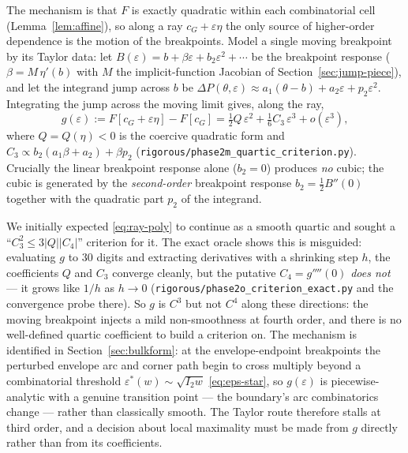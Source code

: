 \documentclass[11pt]{amsart}
\theoremstyle{plain}
\theoremstyle{definition}
\newcommand{\cG}{c_{G}}
\begin{document}
The mechanism is that $F$ is exactly quadratic within each combinatorial
cell (Lemma~\ref{lem:affine}), so along a ray $\cG+\varepsilon\eta$ the
only source of higher-order dependence is the motion of the breakpoints.
Model a single moving breakpoint by its Taylor data: let
$B(\varepsilon) = b + \beta\varepsilon + b_{2}\varepsilon^{2} + \cdots$
be the breakpoint response ($\beta = M\,\eta'(b)$ with $M$ the
implicit-function Jacobian of Section~\ref{sec:jump-piece}), and let the
integrand jump across $b$ be $\Delta P(\theta,\varepsilon) \approx
a_{1}(\theta-b) + a_{2}\varepsilon + p_{2}\varepsilon^{2}$.  Integrating
the jump across the moving limit gives, along the ray,
\begin{equation}\label{eq:ray-poly}
   g(\varepsilon) := F[\cG+\varepsilon\eta]-F[\cG]
   = \tfrac12 Q\,\varepsilon^{2}
   + \tfrac16 C_{3}\,\varepsilon^{3}
   + o(\varepsilon^{3}),
\end{equation}
where $Q = Q(\eta) < 0$ is the coercive quadratic form and
$C_{3}\propto b_{2}(a_{1}\beta+a_{2})+\beta p_{2}$
(\texttt{rigorous/phase2m\_quartic\_criterion.py}).  Crucially the
linear breakpoint response alone ($b_{2}=0$) produces \emph{no} cubic;
the cubic is generated by the \emph{second-order} breakpoint response
$b_{2}=\tfrac12 B''(0)$ together with the quadratic part $p_{2}$ of the
integrand.

We initially expected \eqref{eq:ray-poly} to continue as a smooth
quartic and sought a ``$C_{3}^{2}\leq3|Q||C_{4}|$'' criterion for it.
The exact oracle shows this is misguided: evaluating $g$ to $30$ digits
and extracting derivatives with a shrinking step $h$, the coefficients
$Q$ and $C_{3}$ converge cleanly, but the putative $C_{4}=g''''(0)$
\emph{does not} --- it grows like $1/h$ as $h\to0$
(\texttt{rigorous/phase2o\_criterion\_exact.py} and the convergence
probe there).  So $g$ is $C^{3}$ but not $C^{4}$ along these directions:
the moving breakpoint injects a mild non-smoothness at fourth order, and
there is no well-defined quartic coefficient to build a criterion on.
The mechanism is identified in Section~\ref{sec:bulkform}: at the
envelope-endpoint breakpoints the perturbed envelope arc and corner path
begin to cross multiply beyond a combinatorial threshold
$\varepsilon^{*}(w)\sim\sqrt{I_{2}w}$ \eqref{eq:eps-star}, so
$g(\varepsilon)$ is piecewise-analytic with a genuine transition point
--- the boundary's arc combinatorics change --- rather than classically
smooth.  The Taylor route therefore stalls at third order, and a
decision about local maximality must be made from $g$ directly rather
than from its coefficients.
\end{document}
